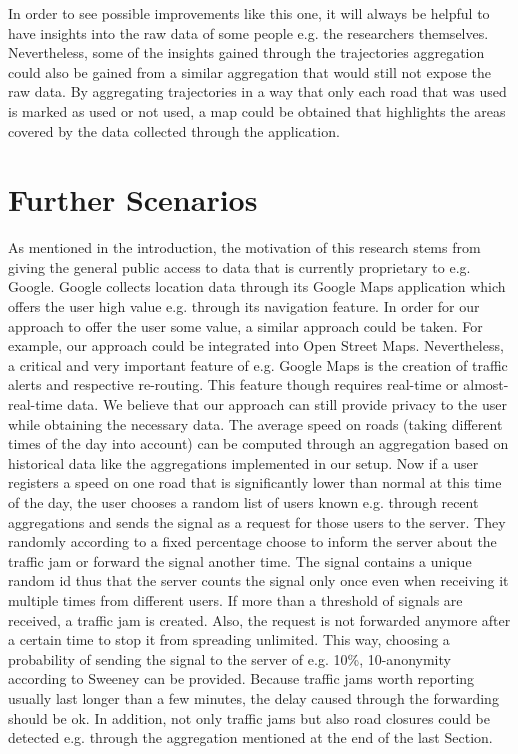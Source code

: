 In order to see possible improvements like this one, it will always be helpful to have insights into the raw data of some people e.g. the researchers themselves. Nevertheless, some of the insights gained through the trajectories aggregation could also be gained from a similar aggregation that would still not expose the raw data. By aggregating trajectories in a way that only each road that was used is marked as used or not used, a map could be obtained that highlights the areas covered by the data collected through the application.

\section{Further Scenarios}
As mentioned in the introduction, the motivation of this research stems from giving the general public access to data that is currently proprietary to e.g. Google. Google collects location data through its Google Maps application which offers the user high value e.g. through its navigation feature. In order for our approach to offer the user some value, a similar approach could be taken. For example, our approach could be integrated into Open Street Maps.
Nevertheless, a critical and very important feature of e.g. Google Maps is the creation of traffic alerts and respective re-routing. This feature though requires real-time or almost-real-time data. We believe that our approach can still provide privacy to the user while obtaining the necessary data. The average speed on roads (taking different times of the day into account) can be computed through an aggregation based on historical data like the aggregations implemented in our setup. 
Now if a user registers a speed on one road that is significantly lower than normal at this time of the day, the user chooses a random list of users known e.g. through recent aggregations and sends the signal as a request for those users to the server. They randomly according to a fixed percentage choose to inform the server about the traffic jam or forward the signal another time. The signal contains a unique random id thus that the server counts the signal only once even when receiving it multiple times from different users. If more than a threshold of signals are received, a traffic jam is created. Also, the request is not forwarded anymore after a certain time to stop it from spreading unlimited. This way, choosing a probability of sending the signal to the server of e.g. 10\%, 10-anonymity according to Sweeney \parencite{k-anonymity} can be provided. Because traffic jams worth reporting usually last longer than a few minutes, the delay caused through the forwarding should be ok. In addition, not only traffic jams but also road closures could be detected e.g. through the aggregation mentioned at the end of the last Section.